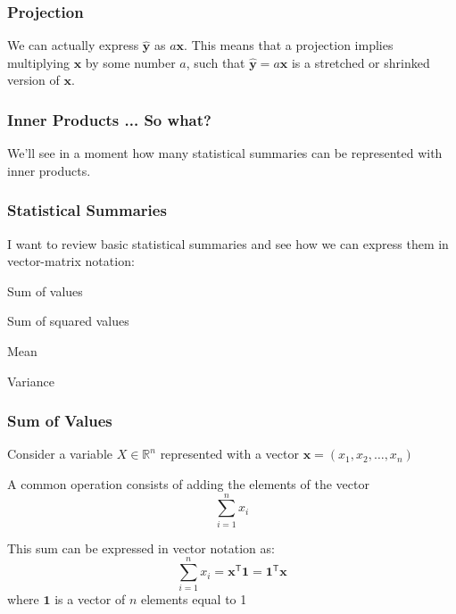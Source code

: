 \documentclass[12pt]{beamer}\usepackage[]{graphicx}\usepackage[]{color}
\begin{document}

\begin{frame}
\frametitle{Projection}

We can actually express $\hat{\mathbf{y}}$ as $a \mathbf{x}$. This means that a projection implies 
multiplying $\mathbf{x}$ by some number $a$, such that
$\hat{\mathbf{y}} = a \mathbf{x}$ is a stretched or shrinked version of $\mathbf{x}$.

\end{frame}


\begin{frame}
\frametitle{Inner Products ... So what?}

We'll see in a moment how many statistical summaries can be represented 
with inner products.

\end{frame}


\begin{frame}
\begin{center}
\Huge{}
\end{center}
\end{frame}


\begin{frame}
\frametitle{Statistical Summaries}

I want to review basic statistical summaries and see how we can express them
in vector-matrix notation:

\bbi
  \item Sum of values
  \item Sum of squared values
  \item Mean
  \item Variance  
\ei

\end{frame}


\begin{frame}
\frametitle{Sum of Values}

Consider a variable $X \in \mathbb{R}^n$ represented with a vector 
$\mathbf{x} = (x_1, x_2, \dots, x_n)$

\bigskip
A common operation consists of adding the elements of the vector
$$
\sum_{i=1}^{n} x_i
$$

\pause
\bigskip
This sum can be expressed in vector notation as:
$$
\sum_{i=1}^{n} x_i = \mathbf{x^{\mathsf{T}} 1} = \mathbf{1^{\mathsf{T}} x}
$$
where $\mathbf{1}$ is a vector of $n$ elements equal to 1

\end{frame}
\end{document}

